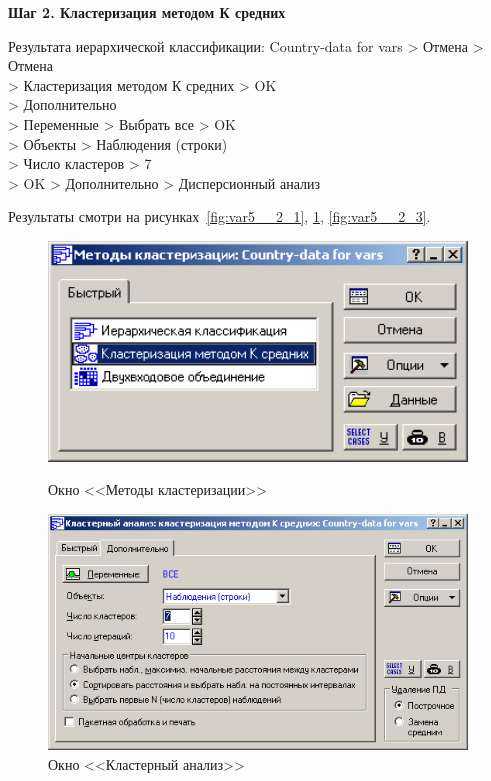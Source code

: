 \newpage

\begin{center}
  \textbf{Шаг 2. Кластеризация методом К средних}
\end{center}

Результата иерархической классификации: Country-data for vars > Отмена > Отмена \\
> Кластеризация методом К средних > OK \\
> Дополнительно \\
> Переменные > Выбрать все > OK \\
> Объекты > Наблюдения (строки) \\
> Число кластеров > 7 \\
> OK > Дополнительно > Дисперсионный анализ

Результаты смотри на рисунках~\ref{fig:var5__2_1}, \ref{fig:var5__2_2}, \ref{fig:var5__2_3}.

\begin{figure}[!h]
  \centering
  \begin{minipage}{0.49\textwidth}
    \centering

    \includegraphics[width=0.99\textwidth]
    {inc/cars_my/var5__2_1.PNG}

    \caption{Окно <<Методы кластеризации>>}
    \label{fig:var5__2_1}
  \end{minipage}
  \begin{minipage}{0.49\textwidth}
    \centering

    \includegraphics[width=0.99\textwidth]
    {inc/cars_my/var5__2_2.PNG}

    \caption{Окно <<Кластерный анализ>>}
    \label{fig:var5__2_2}
  \end{minipage}
\end{figure}

